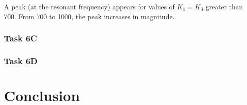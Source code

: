 \documentclass{article}
\begin{document}
A peak (at the resonant frequency) appears for values of $K_1 = K_3$
greater than 700.  From 700 to 1000, the peak increases in magnitude.

\subsubsection*{Task 6C}

\subsubsection*{Task 6D}

\section*{Conclusion}
\end{document}
